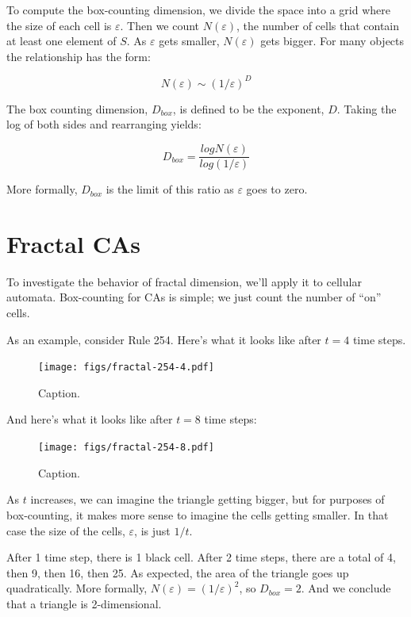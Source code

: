 \documentclass[10pt]{book}
\begin{document}
\newcommand{\veps}{\varepsilon}

To compute the box-counting dimension, we divide the space into a grid
where the size of each cell is $\veps$.  Then we count $N(\veps)$,
the number of cells that contain at least one element of $S$.  As
$\veps$ gets smaller, $N(\veps)$ gets bigger.  For many objects
the relationship has the form:

\[ N(\veps) \sim \left( 1 / \veps \right)^D \]

The box counting dimension, $D_{box}$, is defined to be the exponent, $D$.
Taking the log of both sides and rearranging yields:

\[ D_{box} = \frac{log N(\veps)}{log \left( 1 / \veps \right)} \]

More formally, $D_{box}$ is the limit of this ratio as $\veps$ goes
to zero.


\section{Fractal CAs}

To investigate the behavior of fractal dimension, we'll apply it
to cellular automata.  Box-counting for CAs is simple; we
just count the number of ``on'' cells.

As an example, consider Rule 254.  Here's what it looks like after
$t=4$ time steps.

\begin{figure}
\centerline{\texttt{[image: figs/fractal-254-4.pdf]}}
\caption{Caption.}
\end{figure}

And here's what it looks like after $t=8$ time steps:

\begin{figure}
\centerline{\texttt{[image: figs/fractal-254-8.pdf]}}
\caption{Caption.}
\end{figure}

As $t$ increases, we can imagine the triangle getting bigger,
but for purposes of box-counting, it makes more sense to imagine
the cells getting smaller.  In that case the size of the cells,
$\veps$, is just $1/t$.

After 1 time step, there is 1 black cell.  After 2 time steps, there
are a total of 4, then 9, then 16, then 25.  As expected, the area
of the triangle goes up quadratically.  More formally,
$N(\veps) = \left( 1 / \veps \right)^2$, so $D_{box} = 2$.  And we conclude
that a triangle is 2-dimensional.
\end{document}
